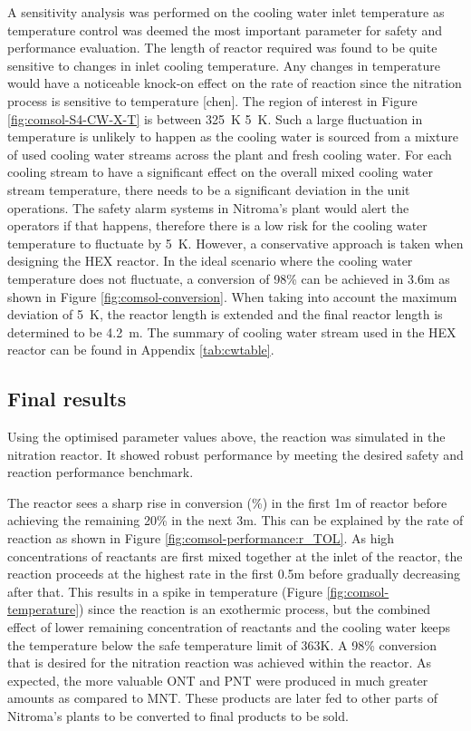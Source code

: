 A sensitivity analysis was performed on the cooling water inlet temperature as temperature control was deemed the most important parameter for safety and performance evaluation. The length of reactor required was found to be quite sensitive to changes in inlet cooling temperature. Any changes in temperature would have a noticeable knock-on effect on the rate of reaction since the nitration process is sensitive to temperature [chen]. The region of interest in Figure \ref{fig:comsol-S4-CW-X-T} is between \SI{325}{\K} \pm \SI{5}{\K}. Such a large fluctuation in temperature is unlikely to happen as the cooling water is sourced from a mixture of used cooling water streams across the plant and fresh cooling water. For each cooling stream to have a significant effect on the overall mixed cooling water stream temperature, there needs to be a significant deviation in the unit operations. The safety alarm systems in Nitroma's plant would alert the operators if that happens, therefore there is a low risk for the cooling water temperature to fluctuate by \pm \SI{5}{\K}. However, a conservative approach is taken when designing the HEX reactor. In the ideal scenario where the cooling water temperature does not fluctuate, a conversion of 98\% can be achieved in 3.6m as shown in Figure \ref{fig:comsol-conversion}. When taking into account the maximum deviation of \pm \SI{5}{\K}, the reactor length is extended and the final reactor length is determined to be \SI{4.2}{\metre}. The summary of cooling water stream used in the HEX reactor can be found in Appendix \ref{tab:cwtable}.

\subsection{Final results}
Using the optimised parameter values above, the reaction was simulated in the nitration reactor. It showed robust performance by meeting the desired safety and reaction performance benchmark.

The reactor sees a sharp rise in conversion (\%) in the first 1m of reactor before achieving the remaining 20\% in the next \approx 3m. This can be explained by the rate of reaction as shown in Figure \ref{fig:comsol-performance:r_TOL}. As high concentrations of reactants are first mixed together at the inlet of the reactor, the reaction proceeds at the highest rate in the first 0.5m before gradually decreasing after that. This results in a spike in temperature (Figure \ref{fig:comsol-temperature}) since the reaction is an exothermic process, but the combined effect of lower remaining concentration of reactants and the cooling water keeps the temperature below the safe temperature limit of 363K. A 98\% conversion that is desired for the nitration reaction was achieved within the reactor. As expected, the more valuable ONT and PNT were produced in much greater amounts as compared to MNT. These products are later fed to other parts of Nitroma's plants to be converted to final products to be sold.

